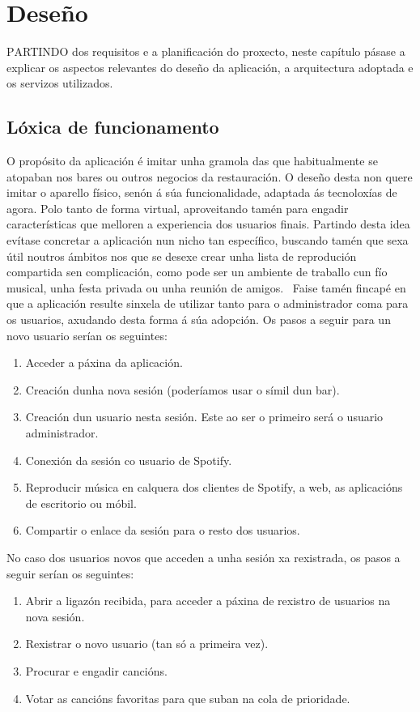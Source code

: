 \chapter{Deseño}
\label{chap:deseno}

\lettrine{P}{ARTINDO} dos requisitos e a planificación do proxecto, neste capítulo pásase a explicar os aspectos relevantes do deseño da aplicación, a arquitectura adoptada e os servizos utilizados.

\section{Lóxica de funcionamento}
O propósito da aplicación é imitar unha gramola das que habitualmente se atopaban nos bares ou outros negocios da restauración. O deseño desta non quere imitar o aparello físico, senón á súa funcionalidade, adaptada ás tecnoloxías de agora. Polo tanto de forma virtual, aproveitando tamén para engadir características que melloren a experiencia dos usuarios finais. Partindo desta idea evítase concretar a aplicación nun nicho tan específico, buscando tamén que sexa útil noutros ámbitos nos que se desexe crear unha lista de reprodución compartida sen complicación, como pode ser un ambiente de traballo cun fío musical, unha festa privada ou unha reunión de amigos.~\smallbreak
Faise tamén fincapé en que a aplicación resulte sinxela de utilizar tanto para o administrador coma para os usuarios, axudando desta forma á súa adopción. Os pasos a seguir para un novo usuario serían os seguintes:

\begin{enumerate}
		\item Acceder a páxina da aplicación.
		\item Creación dunha nova sesión (poderíamos usar o símil dun bar).
		\item Creación dun usuario nesta sesión. Este ao ser o primeiro será o usuario administrador.
		\item Conexión da sesión co usuario de Spotify.
		\item Reproducir música en calquera dos clientes de Spotify, a web, as aplicacións de escritorio ou móbil.
		\item Compartir o enlace da sesión para o resto dos usuarios.
\end{enumerate}

No caso dos usuarios novos que acceden a unha sesión xa rexistrada, os pasos a seguir serían os seguintes:
\begin{enumerate}
		\item Abrir a ligazón recibida, para acceder a páxina de rexistro de usuarios na nova sesión.
		\item Rexistrar o novo usuario (tan só a primeira vez).
		\item Procurar e engadir cancións.
		\item Votar as cancións favoritas para que suban na cola de prioridade.
\end{enumerate}


